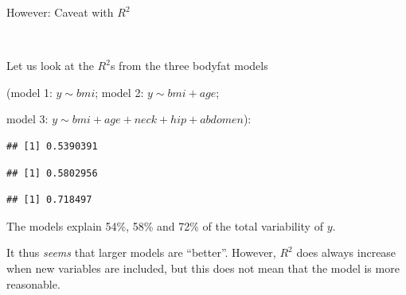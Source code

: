 \documentclass[10pt,ignorenonframetext,]{beamer}
\newenvironment{Shaded}{\begin{snugshade}}{\end{snugshade}}
\newcommand{\KeywordTok}[1]{\textcolor[rgb]{0.13,0.29,0.53}{\textbf{#1}}}
\newcommand{\OperatorTok}[1]{\textcolor[rgb]{0.81,0.36,0.00}{\textbf{#1}}}
\newcommand{\NormalTok}[1]{#1}
\begin{document}
\begin{frame}[fragile]

\begin{block}{However: Caveat with \(R^2\)}

\(~\)

Let us look at the \(R^2\)s from the three bodyfat models

(model 1: \(y\sim bmi\); model 2: \(y\sim bmi + age\);

model 3: \(y\sim bmi + age + neck + hip + abdomen\)):

\tiny

\begin{Shaded}
\end{Shaded}

\begin{verbatim}
## [1] 0.5390391
\end{verbatim}

\begin{Shaded}
\end{Shaded}

\begin{verbatim}
## [1] 0.5802956
\end{verbatim}

\begin{Shaded}
\end{Shaded}

\begin{verbatim}
## [1] 0.718497
\end{verbatim}

\normalsize
The models explain 54\%, 58\% and 72\% of the total variability of
\(y\).

It thus \emph{seems} that larger models are ``better''. However, \(R^2\)
does always increase when new variables are included, but this does not
mean that the model is more reasonable.

\end{block}

\end{frame}
\end{document}

